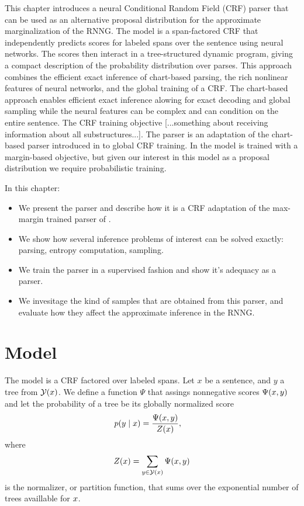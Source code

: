 % 

This chapter introduces a neural Conditional Random Field (CRF) parser that can be used as an alternative proposal distribution for the approximate marginalization of the RNNG. The model is a span-factored CRF that independently predicts scores for labeled spans over the sentence using neural networks. The scores then interact in a tree-structured dynamic program, giving a compact description of the probability distribution over parses. This approach combines the efficient exact inference of chart-based parsing, the rich nonlinear features of neural networks, and the global training of a CRF. The chart-based approach enables efficient exact inference alowing for exact decoding and global sampling while the neural features can be complex and can condition on the entire sentence. The CRF training objective [...something about receiving information about all substructures...]. The parser is an adaptation of the chart-based parser introduced in \citet{stern2017minimal} to global CRF training. In \citet{stern2017minimal} the model is trained with a margin-based objective, but given our interest in this model as a proposal distribution we require probabilistic training.

In this chapter:
\begin{itemize}
  \item We present the parser and describe how it is a CRF adaptation of the max-margin trained parser of \citet{stern2017minimal}.
  \item We show how several inference problems of interest can be solved exactly: parsing, entropy computation, sampling.
  \item We train the parser in a supervised fashion and show it's adequacy as a parser.
  \item We invesitage the kind of samples that are obtained from this parser, and evaluate how they affect the approximate inference in the RNNG.
\end{itemize}

\section{Model}
  The model is a CRF factored over labeled spans. Let $x$ be a sentence, and $y$ a tree from $\mathcal{Y}(x)$. We define a function $\Psi$ that assings nonnegative scores $\Psi(x, y)$ and let the probability of a tree be its globally normalized score
  \begin{align}
    \label{eq:crf-model}
    p(y \mid x) &= \frac{\Psi(x, y)}{Z(x)},
  \end{align}
  where
  \begin{align*}
    Z(x) = \sum_{ y \in \mathcal{Y}(x) } \Psi(x, y)
  \end{align*}
  is the normalizer, or partition function, that sums over the exponential number of trees availlable for $x$.

